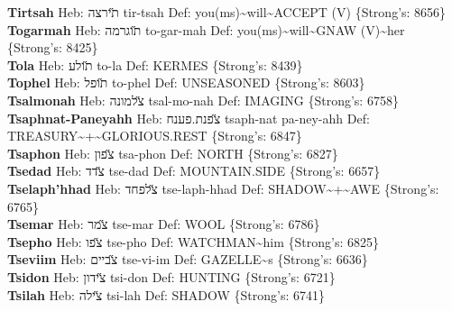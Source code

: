 {\textbf{Tirtsah} Heb: {\large\H תירצה} tir-tsah Def: you(ms)\textasciitilde{}will\textasciitilde{}ACCEPT (V) \{Strong's: 8656\}\hfill{}\\

\textbf{Togarmah} Heb: {\large\H תוגרמה} to-gar-mah Def: you(ms)\textasciitilde{}will\textasciitilde{}GNAW (V)\textasciitilde{}her \{Strong's: 8425\}\hfill{}\\

\textbf{Tola} Heb: {\large\H תולע} to-la Def: KERMES \{Strong's: 8439\}\hfill{}\\

\textbf{Tophel} Heb: {\large\H תופל} to-phel Def: UNSEASONED \{Strong's: 8603\}\hfill{}\\

\textbf{Tsalmonah} Heb: {\large\H צלמונה} tsal-mo-nah Def: IMAGING \{Strong's: 6758\}\hfill{}\\

\textbf{Tsaphnat-Paneyahh} Heb: {\large\H צפנת.פענח} tsaph-nat pa-ney-ahh Def: TREASURY\textasciitilde{}+\textasciitilde{}GLORIOUS.REST \{Strong's: 6847\}\hfill{}\\

\textbf{Tsaphon} Heb: {\large\H צפון} tsa-phon Def: NORTH \{Strong's: 6827\}\hfill{}\\

\textbf{Tsedad} Heb: {\large\H צדד} tse-dad Def: MOUNTAIN.SIDE \{Strong's: 6657\}\hfill{}\\

\textbf{Tselaph'hhad} Heb: {\large\H צלפחד} tse-laph-hhad Def: SHADOW\textasciitilde{}+\textasciitilde{}AWE \{Strong's: 6765\}\hfill{}\\

\textbf{Tsemar} Heb: {\large\H צמר} tse-mar Def: WOOL \{Strong's: 6786\}\hfill{}\\

\textbf{Tsepho} Heb: {\large\H צפו} tse-pho Def: WATCHMAN\textasciitilde{}him \{Strong's: 6825\}\hfill{}\\

\textbf{Tseviim} Heb: {\large\H צביים} tse-vi-im Def: GAZELLE\textasciitilde{}s \{Strong's: 6636\}\hfill{}\\

\textbf{Tsidon} Heb: {\large\H צידון} tsi-don Def: HUNTING \{Strong's: 6721\}\hfill{}\\

\textbf{Tsilah} Heb: {\large\H צילה} tsi-lah Def: SHADOW \{Strong's: 6741\}\hfill{}\\

}
